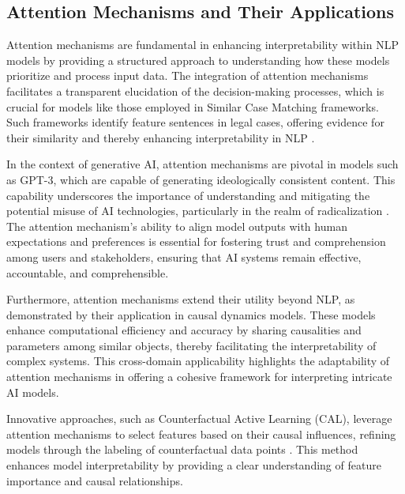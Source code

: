 \subsection{Attention Mechanisms and Their Applications} \label{subsec:Attention Mechanisms and Their Applications}



Attention mechanisms are fundamental in enhancing interpretability within NLP models by providing a structured approach to understanding how these models prioritize and process input data. The integration of attention mechanisms facilitates a transparent elucidation of the decision-making processes, which is crucial for models like those employed in Similar Case Matching frameworks. Such frameworks identify feature sentences in legal cases, offering evidence for their similarity and thereby enhancing interpretability in NLP \cite{lin2023interpretabilityframeworksimilarcase}.

In the context of generative AI, attention mechanisms are pivotal in models such as GPT-3, which are capable of generating ideologically consistent content. This capability underscores the importance of understanding and mitigating the potential misuse of AI technologies, particularly in the realm of radicalization \cite{mcguffie2020radicalizationrisksgpt3advanced}. The attention mechanism's ability to align model outputs with human expectations and preferences is essential for fostering trust and comprehension among users and stakeholders, ensuring that AI systems remain effective, accountable, and comprehensible.

Furthermore, attention mechanisms extend their utility beyond NLP, as demonstrated by their application in causal dynamics models. These models enhance computational efficiency and accuracy by sharing causalities and parameters among similar objects, thereby facilitating the interpretability of complex systems. This cross-domain applicability highlights the adaptability of attention mechanisms in offering a cohesive framework for interpreting intricate AI models.

Innovative approaches, such as Counterfactual Active Learning (CAL), leverage attention mechanisms to select features based on their causal influences, refining models through the labeling of counterfactual data points \cite{sen2018supervisingfeatureinfluence}. This method enhances model interpretability by providing a clear understanding of feature importance and causal relationships.

